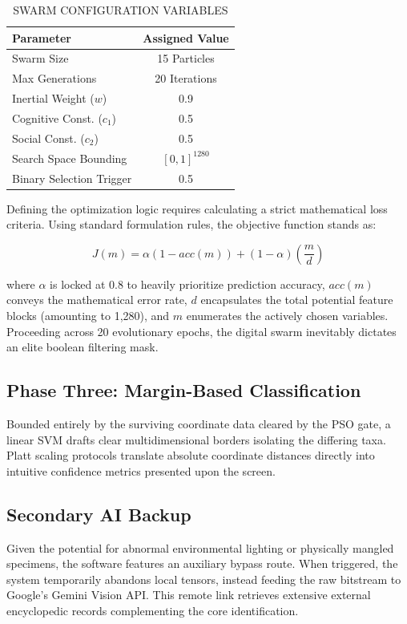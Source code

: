 \documentclass[conference]{IEEEtran}
\begin{document}
\begin{table}[htbp]
\caption{SWARM CONFIGURATION VARIABLES}
\label{tab:pso}
\centering
\begin{tabular}{|l|c|}
\hline
\textbf{Parameter}        & \textbf{Assigned Value} \\
\hline
Swarm Size              & 15 Particles \\
Max Generations         & 20 Iterations \\
Inertial Weight ($w$)   & 0.9 \\
Cognitive Const. ($c_1$)& 0.5 \\
Social Const. ($c_2$)   & 0.5 \\
Search Space Bounding   & $[0, 1]^{1280}$ \\
Binary Selection Trigger& 0.5 \\
\hline
\end{tabular}
\end{table}

Defining the optimization logic requires calculating a strict mathematical loss criteria. Using standard formulation rules, the objective function stands as:

\begin{equation}
J(m) = \alpha(1 - acc(m)) + (1 - \alpha)\left(\frac{m}{d}\right)
\label{eq:pso_obj}
\end{equation}

where $\alpha$ is locked at 0.8 to heavily prioritize prediction accuracy, $acc(m)$ conveys the mathematical error rate, $d$ encapsulates the total potential feature blocks (amounting to 1,280), and $m$ enumerates the actively chosen variables. Proceeding across 20 evolutionary epochs, the digital swarm inevitably dictates an elite boolean filtering mask.

\subsection{Phase Three: Margin-Based Classification}
Bounded entirely by the surviving coordinate data cleared by the PSO gate, a linear SVM drafts clear multidimensional borders isolating the differing taxa. Platt scaling protocols translate absolute coordinate distances directly into intuitive confidence metrics presented upon the screen.

\subsection{Secondary AI Backup}
Given the potential for abnormal environmental lighting or physically mangled specimens, the software features an auxiliary bypass route. When triggered, the system temporarily abandons local tensors, instead feeding the raw bitstream to Google's Gemini Vision API. This remote link retrieves extensive external encyclopedic records complementing the core identification.
\end{document}
